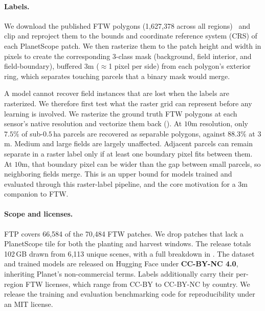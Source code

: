 \documentclass[10pt,twocolumn,letterpaper]{article}
\begin{document}
\paragraph{Labels.}
\label{sec:labels}
We download the published FTW polygons (1{,}627{,}378 across all regions)~\cite{ftw-source-coop} and clip and reproject them to the bounds and coordinate reference system (CRS) of each PlanetScope patch. We then rasterize them to the patch height and width in pixels to create the corresponding 3-class mask (background, field interior, and field-boundary), buffered $3$m ($\approx$1 pixel per side) from each polygon's exterior ring, which separates touching parcels that a binary mask would merge.

A model cannot recover field instances that are lost when the labels are rasterized. We therefore first test what the raster grid can represent before any learning is involved. We rasterize the ground truth FTW polygons at each sensor's native resolution and vectorize them back (). At $10$m resolution, only $7.5\%$ of sub-$0.5$\,ha parcels are recovered as separable polygons, against $88.3\%$ at $3$m. Medium and large fields are largely unaffected. Adjacent parcels can remain separate in a raster label only if at least one boundary pixel fits between them. At $10$m, that boundary pixel can be wider than the gap between small parcels, so neighboring fields merge. This is an upper bound for models trained and evaluated through this raster-label pipeline, and the core motivation for a $3$m companion to FTW.

\begin{table}[t]
    \centering
    \caption{\textbf{Higher resolution preserves more fields when rasterizing ground truth labels.} The table reports the fraction of FTW field polygons recovered without merging after rasterizing at varying resolutions and
    vectorizing them back. $10$m resolution merges more than $90\%$ of small
    fields with neighboring parcels.}
    \label{tab:representation_ceiling}
    
\end{table}

\paragraph{Scope and licenses.} FTP covers 66{,}584 of the 70{,}484 FTW patches. We drop patches that lack a PlanetScope tile for both the planting and harvest windows. The release totals 102\,GB drawn from 6{,}113 unique scenes, with a full breakdown in . The dataset and trained models are released on Hugging Face under \textbf{CC-BY-NC 4.0}, inheriting Planet's non-commercial terms. Labels additionally carry their per-region FTW licenses, which range from CC-BY to CC-BY-NC by country. We release the training and evaluation benchmarking code for reproducibility under an MIT license.
\end{document}
